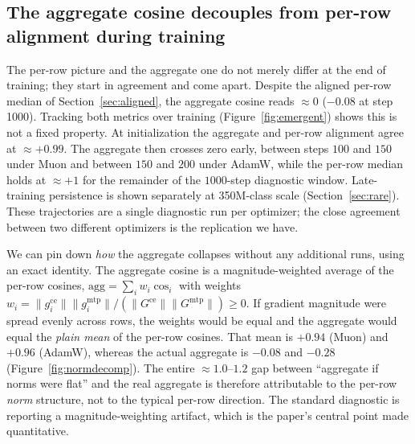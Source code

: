 \subsection{The aggregate cosine decouples from per-row alignment during training}
\label{sec:emergent}
The per-row picture and the aggregate one do not merely differ at the end of
training; they start in agreement and come apart. Despite the aligned per-row
median of Section~\ref{sec:aligned}, the aggregate cosine reads $\approx 0$
($-0.08$ at step 1000).
Tracking both metrics over training (Figure~\ref{fig:emergent}) shows this is not a fixed property. At initialization the aggregate and per-row alignment agree at $\approx +0.99$. The aggregate then crosses zero early, between steps $100$ and $150$ under Muon and between $150$ and $200$ under AdamW, while the per-row median holds at $\approx +1$ for the remainder of the $1000$-step diagnostic window. Late-training persistence is shown separately at 350M-class scale (Section~\ref{sec:rare}). These trajectories are a single diagnostic run per
optimizer; the close agreement between two different optimizers is the
replication we have.

We can pin down \emph{how} the aggregate collapses without any additional runs,
using an exact identity. The aggregate cosine is a magnitude-weighted average of
the per-row cosines, $\text{agg}=\sum_i w_i\cos_i$ with weights
$w_i=\lVert g^{\text{ce}}_i\rVert\lVert g^{\text{mtp}}_i\rVert/(\lVert
G^{\text{ce}}\rVert\lVert G^{\text{mtp}}\rVert)\ge 0$. If gradient magnitude were
spread evenly across rows, the weights would be equal and the aggregate would
equal the \emph{plain mean} of the per-row cosines. That mean is $+0.94$ (Muon)
and $+0.96$ (AdamW), whereas the actual aggregate is $-0.08$ and $-0.28$
(Figure~\ref{fig:normdecomp}). The entire $\approx\!1.0$--$1.2$ gap between ``aggregate if norms were flat'' and the real aggregate is therefore attributable to the per-row \emph{norm} structure, not to the typical per-row direction. The standard diagnostic is reporting a magnitude-weighting artifact, which is the paper's central point made quantitative.

